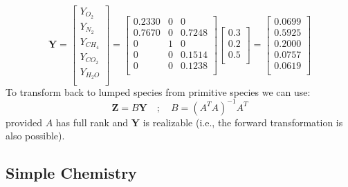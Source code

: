 \begin{equation}\label{eq:transform_to_primitive}
\mathbf{Y}=\left[\begin{array}{c}
       Y_{O_2} \\
       Y_{N_2} \\
       Y_{CH_4} \\
       Y_{CO_2} \\
       Y_{H_2O} \\
     \end{array}\right]
     =\left[\begin{array}{ccc}
     0.2330 & 0 & 0 \\
     0.7670 & 0 & 0.7248 \\
     0 & 1 & 0 \\
     0 & 0 & 0.1514 \\
     0 & 0 & 0.1238 \\
     \end{array}\right]
     \left[\begin{array}{c}
     0.3 \\
     0.2 \\
     0.5 \\
     \end{array}\right]
     =\left[\begin{array}{c}
     0.0699\\
     0.5925\\
     0.2000\\
     0.0757\\
     0.0619\\
     \end{array}\right]
\end{equation}
To transform back to lumped species from primitive species we can use:
\begin{equation}\label{eq:transform_back}
\textbf{Z}=B\textbf{Y} \quad ; \quad B=(A^TA)^{-1}A^T
\end{equation}
provided $A$ has full rank and $\mathbf{Y}$ is realizable (i.e., the forward transformation is also possible).

\subsection{Simple Chemistry}
\label{sec:simplechemistry}

